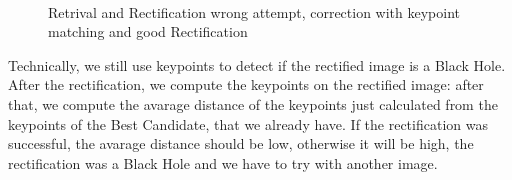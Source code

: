 \documentclass[10pt,twocolumn,letterpaper]{article}
\begin{document}
\begin{figure}
    \centering
    \\
    \caption{Retrival and Rectification wrong attempt, correction with keypoint matching and good Rectification}
    \label{fig:worst_rectification}
\end{figure}

Technically, we still use keypoints to detect if the rectified image is a Black Hole. After the rectification, we compute the keypoints on the rectified image: after that, we compute the avarage distance of the keypoints just calculated from the keypoints of the Best Candidate, that we already have. If the rectification was successful, the avarage distance should be low, otherwise it will be high, the rectification was a Black Hole and we have to try with another image.
\end{document}
